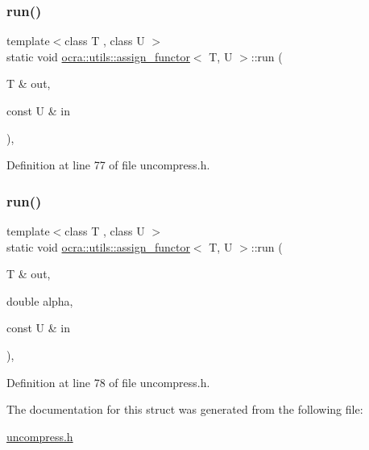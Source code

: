 \subsubsection{\texorpdfstring{run()}{run()}\hspace{0.1cm}{\footnotesize\ttfamily [1/2]}}
{\footnotesize\ttfamily template$<$class T , class U $>$ \\
static void \hyperlink{structocra_1_1utils_1_1assign__functor}{ocra\+::utils\+::assign\+\_\+functor}$<$ T, U $>$\+::run (\begin{DoxyParamCaption}\item[{T \&}]{out,  }\item[{const U \&}]{in }\end{DoxyParamCaption})\hspace{0.3cm}{\ttfamily [inline]}, {\ttfamily [static]}}



Definition at line 77 of file uncompress.\+h.

\hypertarget{structocra_1_1utils_1_1assign__functor_a1fbc5042510c940d2968b51a9035cd75}{}\label{structocra_1_1utils_1_1assign__functor_a1fbc5042510c940d2968b51a9035cd75} 
\subsubsection{\texorpdfstring{run()}{run()}\hspace{0.1cm}{\footnotesize\ttfamily [2/2]}}
{\footnotesize\ttfamily template$<$class T , class U $>$ \\
static void \hyperlink{structocra_1_1utils_1_1assign__functor}{ocra\+::utils\+::assign\+\_\+functor}$<$ T, U $>$\+::run (\begin{DoxyParamCaption}\item[{T \&}]{out,  }\item[{double}]{alpha,  }\item[{const U \&}]{in }\end{DoxyParamCaption})\hspace{0.3cm}{\ttfamily [inline]}, {\ttfamily [static]}}



Definition at line 78 of file uncompress.\+h.



The documentation for this struct was generated from the following file\+:\begin{DoxyCompactItemize}
\item 
\hyperlink{uncompress_8h}{uncompress.\+h}\end{DoxyCompactItemize}
